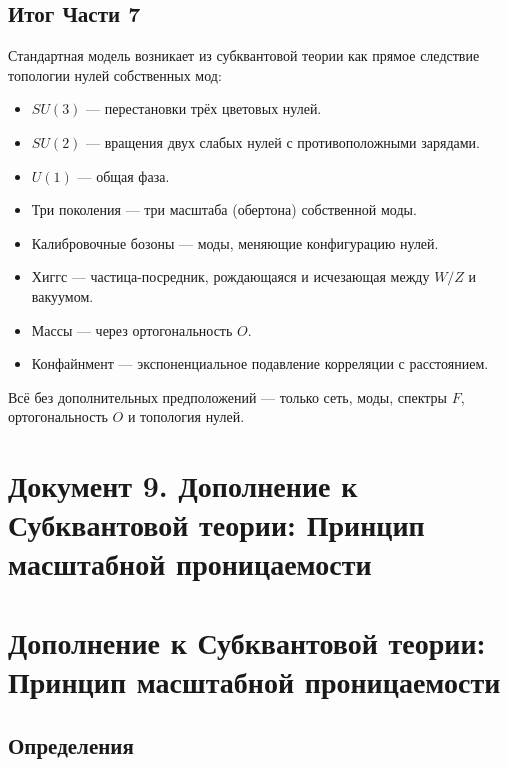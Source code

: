 \documentclass[12pt,a4paper]{article}
\begin{document}
\subsection*{Итог Части 7}

Стандартная модель возникает из субквантовой теории как прямое следствие топологии нулей собственных мод:

\begin{itemize}
    \item $SU(3)$ — перестановки трёх цветовых нулей.
    \item $SU(2)$ — вращения двух слабых нулей с противоположными зарядами.
    \item $U(1)$ — общая фаза.
    \item Три поколения — три масштаба (обертона) собственной моды.
    \item Калибровочные бозоны — моды, меняющие конфигурацию нулей.
    \item Хиггс — частица-посредник, рождающаяся и исчезающая между $W/Z$ и вакуумом.
    \item Массы — через ортогональность $O$.
    \item Конфайнмент — экспоненциальное подавление корреляции с расстоянием.
\end{itemize}

Всё без дополнительных предположений — только сеть, моды, спектры $F$, ортогональность $O$ и топология нулей.


\newpage
\section*{Документ 9. Дополнение к Субквантовой теории: Принцип масштабной проницаемости}

\section{Дополнение к Субквантовой теории: Принцип масштабной проницаемости}

\subsection{Определения}
\end{document}
